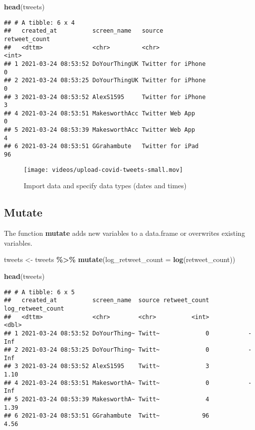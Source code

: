 \documentclass[
]{article}
\newenvironment{Shaded}{\begin{snugshade}}{\end{snugshade}}
\newcommand{\AttributeTok}[1]{\textcolor[rgb]{0.13,0.29,0.53}{#1}}
\newcommand{\FunctionTok}[1]{\textcolor[rgb]{0.13,0.29,0.53}{\textbf{#1}}}
\newcommand{\NormalTok}[1]{#1}
\newcommand{\OtherTok}[1]{\textcolor[rgb]{0.56,0.35,0.01}{#1}}
\newcommand{\SpecialCharTok}[1]{\textcolor[rgb]{0.81,0.36,0.00}{\textbf{#1}}}
\begin{document}
\begin{Shaded}
\begin{Highlighting}[]
\FunctionTok{head}\NormalTok{(tweets)}
\end{Highlighting}
\end{Shaded}

\begin{verbatim}
## # A tibble: 6 x 4
##   created_at          screen_name   source             retweet_count
##   <dttm>              <chr>         <chr>                      <int>
## 1 2021-03-24 08:53:52 DoYourThingUK Twitter for iPhone             0
## 2 2021-03-24 08:53:25 DoYourThingUK Twitter for iPhone             0
## 3 2021-03-24 08:53:52 AlexS1595     Twitter for iPhone             3
## 4 2021-03-24 08:53:51 MakesworthAcc Twitter Web App                0
## 5 2021-03-24 08:53:39 MakesworthAcc Twitter Web App                4
## 6 2021-03-24 08:53:51 GGrahambute   Twitter for iPad              96
\end{verbatim}

\begin{figure}
\centering
\texttt{[image: videos/upload-covid-tweets-small.mov]}
\caption{Import data and specify data types (dates and times)}
\end{figure}

\subsection{Mutate}\label{mutate}

The function \textbf{mutate} adds new variables to a data.frame or overwrites existing variables.

\begin{Shaded}
\begin{Highlighting}[]
\NormalTok{tweets }\OtherTok{\textless{}{-}}\NormalTok{ tweets }\SpecialCharTok{\%\textgreater{}\%}
  \FunctionTok{mutate}\NormalTok{(}\AttributeTok{log\_retweet\_count =} \FunctionTok{log}\NormalTok{(retweet\_count))}
  
\FunctionTok{head}\NormalTok{(tweets)}
\end{Highlighting}
\end{Shaded}

\begin{verbatim}
## # A tibble: 6 x 5
##   created_at          screen_name  source retweet_count log_retweet_count
##   <dttm>              <chr>        <chr>          <int>             <dbl>
## 1 2021-03-24 08:53:52 DoYourThing~ Twitt~             0           -Inf   
## 2 2021-03-24 08:53:25 DoYourThing~ Twitt~             0           -Inf   
## 3 2021-03-24 08:53:52 AlexS1595    Twitt~             3              1.10
## 4 2021-03-24 08:53:51 MakesworthA~ Twitt~             0           -Inf   
## 5 2021-03-24 08:53:39 MakesworthA~ Twitt~             4              1.39
## 6 2021-03-24 08:53:51 GGrahambute  Twitt~            96              4.56
\end{verbatim}
\end{document}
